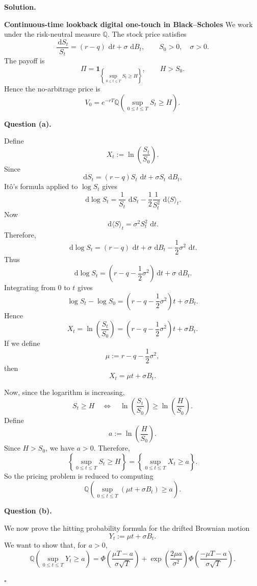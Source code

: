 \documentclass[11pt]{article}
\theoremstyle{plain}
\newcommand{\dd}{\,\mathrm{d}}
\newcommand{\1}{\mathbf{1}}
\theoremstyle{definition}
\newenvironment{solution}
{\par\medskip\noindent\textbf{Solution.}\par\medskip}
{\hfill$\square$\par\medskip}
\newenvironment{solutionpart}[1]
{\par\medskip\noindent\textbf{#1.}\par\smallskip}
{\par\medskip}
\begin{document}


\begin{solution}
\textbf{Continuous-time lookback digital one-touch in Black--Scholes}
We work under the risk-neutral measure $\mathbb{Q}$. The stock price satisfies
\[
\frac{\dd S_t}{S_t}=(r-q)\,\dd t+\sigma\,\dd B_t,
\qquad S_0>0,\quad \sigma>0.
\]
The payoff is
\[
\Pi=\mathbf 1_{\left\{\sup_{0\le t\le T}S_t\ge H\right\}},
\qquad H>S_0.
\]
Hence the no-arbitrage price is
\[
V_0=e^{-rT}\mathbb{Q}\left(\sup_{0\le t\le T}S_t\ge H\right).
\]

\begin{solutionpart}{Question (a)}
Define
\[
X_t:=\ln\left(\frac{S_t}{S_0}\right).
\]
Since
\[
\dd S_t=(r-q)S_t\,\dd t+\sigma S_t\,\dd B_t,
\]
It\^o's formula applied to $\log S_t$ gives
\[
\dd \log S_t
=
\frac{1}{S_t}\,\dd S_t
-
\frac12\frac{1}{S_t^2}\,\dd\langle S\rangle_t.
\]
Now
\[
\dd\langle S\rangle_t=\sigma^2 S_t^2\,\dd t.
\]
Therefore,
\[
\dd \log S_t
=
(r-q)\,\dd t+\sigma\,\dd B_t
-
\frac12\sigma^2\,\dd t.
\]
Thus
\[
\dd \log S_t
=
\left(r-q-\frac12\sigma^2\right)\dd t+\sigma\,\dd B_t.
\]
Integrating from $0$ to $t$ gives
\[
\log S_t-\log S_0
=
\left(r-q-\frac12\sigma^2\right)t+\sigma B_t.
\]
Hence
\[
X_t
=
\ln\left(\frac{S_t}{S_0}\right)
=
\left(r-q-\frac12\sigma^2\right)t+\sigma B_t.
\]
If we define
\[
\mu:=r-q-\frac12\sigma^2,
\]
then
\[
\boxed{
X_t=\mu t+\sigma B_t.
}
\]

Now, since the logarithm is increasing,
\[
S_t\ge H
\quad\Longleftrightarrow\quad
\ln\left(\frac{S_t}{S_0}\right)\ge \ln\left(\frac{H}{S_0}\right).
\]
Define
\[
a:=\ln\left(\frac{H}{S_0}\right).
\]
Since $H>S_0$, we have $a>0$. Therefore,
\[
\left\{\sup_{0\le t\le T}S_t\ge H\right\}
=
\left\{\sup_{0\le t\le T}X_t\ge a\right\}.
\]
So the pricing problem is reduced to computing
\[
\mathbb{Q}\left(\sup_{0\le t\le T}(\mu t+\sigma B_t)\ge a\right).
\]
\end{solutionpart}

\begin{solutionpart}{Question (b)}
We now prove the hitting probability formula for the drifted Brownian motion
\[
Y_t:=\mu t+\sigma B_t.
\]
We want to show that, for $a>0$,
\[
\mathbb{Q}\left(\sup_{0\le t\le T}Y_t\ge a\right)
=
\Phi\left(\frac{\mu T-a}{\sigma\sqrt T}\right)
+
\exp\left(\frac{2\mu a}{\sigma^2}\right)
\Phi\left(\frac{-\mu T-a}{\sigma\sqrt T}\right).
\]

\medskip


\end{solutionpart}
\end{solution}
\end{document}
